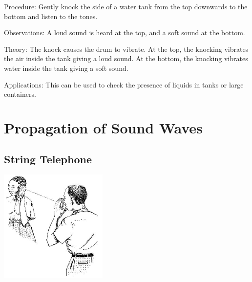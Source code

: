 \begin{multicols}{2}
\begin{description*}
\item[Procedure:]{Gently knock the side of a water tank from the top downwards to the bottom and listen to the tones.}
\item[Observations:]{A loud sound is heard at the top, and a soft sound at the bottom.}
\item[Theory:]{The knock causes the drum to vibrate. At the top, the knocking vibrates the air inside the tank giving a loud sound. At the bottom, the knocking vibrates water inside the tank giving a soft sound.}
\item[Applications:]{This can be used to check the presence of liquids in tanks or large containers.}
\end{description*}


\section*{Propagation of Sound Waves} 


\subsection{String Telephone}

\begin{center}
\includegraphics[width=0.4\textwidth]{./img/source/wave-motion.jpg}
\end{center}


\end{multicols}
